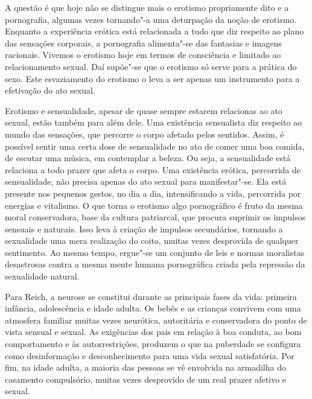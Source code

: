 A questão é que hoje não se distingue mais o erotismo propriamente dito
e a pornografia, algumas vezes tornando"-a uma deturpação da noção de
erotismo. Enquanto a experiência erótica está relacionada a tudo que diz
respeito ao plano das sensações corporais, a pornografia alimenta"-se das
fantasias e imagens racionais. Vivemos o erotismo hoje em termos de
consciência e limitado ao relacionamento sexual. Daí supõe"-se que o
erotismo só serve para a prática do sexo. Este esvaziamento do erotismo
o leva a ser apenas um instrumento para a efetivação do ato sexual.

Erotismo e sensualidade, apesar de quase sempre estarem relacionas ao
ato sexual, estão também para além dele. Uma existência sensualista diz
respeito ao mundo das sensações, que percorre o corpo afetado pelos
sentidos. Assim, é possível sentir uma certa dose de sensualidade no ato
de comer uma boa comida, de escutar uma música, em contemplar a beleza.
Ou seja, a sensualidade está relaciona a todo prazer que afeta o corpo.
Uma existência erótica, percorrida de sensualidade, não precisa apenas
do ato sexual para manifestar"-se. Ela está presente nos pequenos gestos,
no dia a dia, intensificando a vida, percorrida por energias e
vitalismo. O que torna o erotismo algo pornográfico é fruto da mesma
moral conservadora, base da cultura patriarcal, que procura suprimir os
impulsos sensuais e naturais. Isso leva à criação de impulsos
secundários, tornando a sexualidade uma mera realização do coito, muitas
vezes desprovida de qualquer sentimento. Ao mesmo tempo, ergue"-se um
conjunto de leis e normas moralistas desastrosas contra a mesma mente
humana pornográfica criada pela repressão da sexualidade natural.

Para Reich, a neurose se constitui durante as principais fases da vida:
primeira infância, adolescência e idade adulta. Os bebês e as crianças
convivem com uma atmosfera familiar muitas vezes neurótica, autoritária
e conservadora do ponto de vista sensual e sexual. As exigências dos
pais em relação à boa conduta, ao bom comportamento e às
autorrestrições, produzem o que na puberdade se configura como
desinformação e desconhecimento para uma vida sexual satisfatória. Por
fim, na idade adulta, a maioria das pessoas se vê envolvida na armadilha
do casamento compulsório, muitas vezes desprovido de um real prazer
afetivo e sexual.

